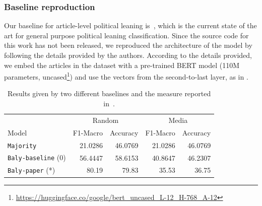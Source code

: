 \subsubsection{\statusgreen Baseline reproduction}
\label{ssec:ps_leaning_classifier}








Our baseline for article-level political leaning is~\citet{baly2020we}, which is the current state of the art for general purpose political leaning classification.
Since the source code for this work has not been released, we reproduced the architecture of the model by following the details provided by the authors. %
According to the details provided, we embed the articles in the dataset with a pre-trained BERT model (110M parameters, uncased\footnote{\url{https://huggingface.co/google/bert_uncased_L-12_H-768_A-12}}) and use the vectors from the second-to-last layer, as in \citet{baly2020we}. %

\begin{table}[!htbp]
    \centering
   \scriptsize
    \begin{tabular}{l|rr|rr}
        & \multicolumn{2}{c}{Random} & \multicolumn{2}{c}{Media} \\
        Model & F1-Macro & Accuracy & F1-Macro & Accuracy \\
        \hline
        \texttt{Majority} & 21.0286 & 46.0769 & 21.0286 & 46.0769 \\
        \texttt{Baly-baseline} (0) & 56.4447 & 58.6153 & 40.8647 & 46.2307 \\
        \texttt{Baly-paper} (*) & 80.19 & 79.83 & 35.53 & 36.75 \\
    \end{tabular}
    \caption{Results given by two different baselines and the measure reported in~\citet{baly2020we}.}
    \label{tab:results_baselines_classifier}
\end{table}

